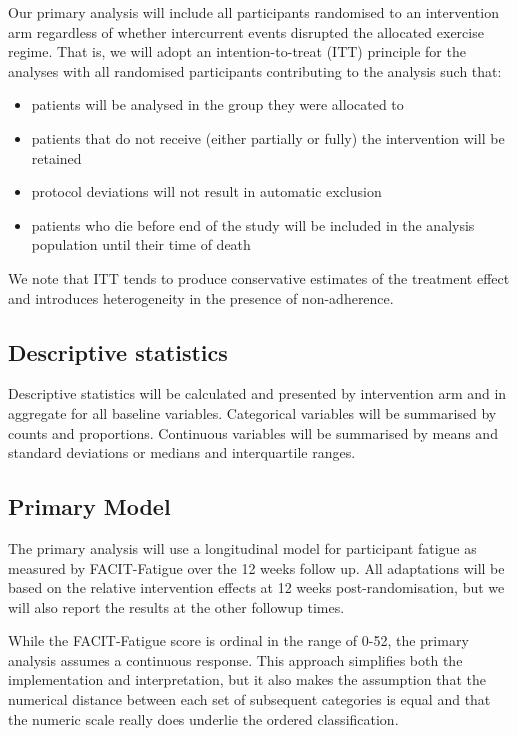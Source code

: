 \documentclass[
]{article}
\providecommand{\tightlist}{%
  \setlength{\itemsep}{0pt}\setlength{\parskip}{0pt}}
\begin{document}
Our primary analysis will include all participants randomised to an intervention arm regardless of whether intercurrent events disrupted the allocated exercise regime.
That is, we will adopt an intention-to-treat (ITT) principle for the analyses with all randomised participants contributing to the analysis such that:

\begin{itemize}
  \tightlist
  \item
        patients will be analysed in the group they were allocated to
  \item
        patients that do not receive (either partially or fully) the intervention will be retained
  \item
        protocol deviations will not result in automatic exclusion
  \item
        patients who die before end of the study  will be included in the analysis population until their time of death
\end{itemize}

We note that ITT tends to produce conservative estimates of the treatment effect and introduces heterogeneity in the presence of non-adherence.

\hypertarget{descriptive-statistics}{%
  \subsection{Descriptive statistics}\label{descriptive-statistics}}

Descriptive statistics will be calculated and presented by intervention arm and in aggregate for all baseline variables.
Categorical variables will be summarised by counts and proportions.
Continuous variables will be summarised by means and standard deviations or medians and interquartile ranges.

\hypertarget{primary-model}{%
  \subsection{Primary Model}\label{primary-model}}

The primary analysis will use a longitudinal model for participant fatigue as measured by FACIT-Fatigue over the 12 weeks follow up.
All adaptations will be based on the relative intervention effects at 12 weeks post-randomisation, but we will also report the results at the other followup times.

While the FACIT-Fatigue score is ordinal in the range of 0-52, the primary analysis assumes a continuous response.
This approach simplifies both the implementation and interpretation, but it also makes the assumption that the numerical distance between each set of subsequent categories is equal and that the numeric scale really does underlie the ordered classification.
\end{document}
